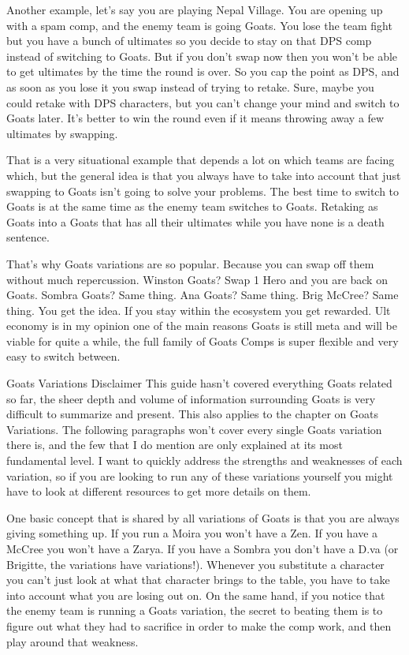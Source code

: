Another example, let’s say you are playing Nepal Village. You are opening up with a spam comp, and the enemy team is going Goats. You lose the team fight but you have a bunch of ultimates so you decide to stay on that DPS comp instead of switching to Goats. But if you don’t swap now then you won't be able to get ultimates by the time the round is over. So you cap the point as DPS, and as soon as you lose it you swap instead of trying to retake. Sure, maybe you could retake with DPS characters, but you can’t change your mind and switch to Goats later. It’s better to win the round even if it means throwing away a few ultimates by swapping.
 
That is a very situational example that depends a lot on which teams are facing which, but the general idea is that you always have to take into account that just swapping to Goats isn’t going to solve your problems. The best time to switch to Goats is at the same time as the enemy team switches to Goats. Retaking as Goats into a Goats that has all their ultimates while you have none is a death sentence. 

That’s why Goats variations are so popular. Because you can swap off them without much repercussion. Winston Goats? Swap 1 Hero and you are back on Goats. Sombra Goats? Same thing. Ana Goats? Same thing. Brig McCree? Same thing. You get the idea. If you stay within the ecosystem you get rewarded. Ult economy is in my opinion one of the main reasons Goats is still meta and will be viable for quite a while, the full family of Goats Comps is super flexible and very easy to switch between.



Goats Variations
Disclaimer
This guide hasn’t covered everything Goats related so far, the sheer depth and volume of information surrounding Goats is very difficult to summarize and present. This also applies to the chapter on Goats Variations. The following paragraphs won’t cover every single Goats variation there is, and the few that I do mention are only explained at its most fundamental level. I want to quickly address the strengths and weaknesses of each variation, so if you are looking to run any of these variations yourself you might have to look at different resources to get more details on them.

One basic concept that is shared by all variations of Goats is that you are always giving something up. If you run a Moira you won’t have a Zen. If you have a McCree you won’t have a Zarya. If you have a Sombra you don’t have a D.va (or Brigitte, the variations have variations!). Whenever you substitute a character you can’t just look at what that character brings to the table, you have to take into account what you are losing out on. On the same hand, if you notice that the enemy team is running a Goats variation, the secret to beating them is to figure out what they had to sacrifice in order to make the comp work, and then play around that weakness.

